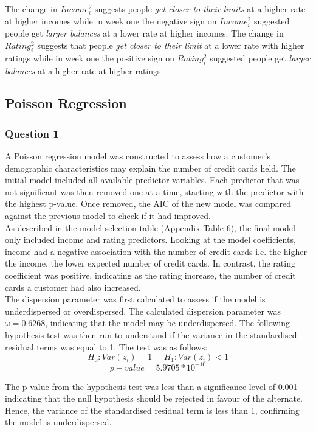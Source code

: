 \documentclass[12pt]{article}
\begin{document}
{The change in $Income^2_i$ suggests people \emph{get closer to their limits} at a higher rate at higher incomes while in week one the negative sign on $Income^2_i$ suggested people get \emph{larger balances} at a lower rate at higher incomes. The change in $Rating^2_i$ suggests that people \emph{get closer to their limit} at a lower rate with higher ratings while in week one the positive sign on $Rating^2_i$ suggested people get \emph{larger balances} at a higher rate at higher ratings. 

\subsection*{Poisson Regression}
\subsubsection*{Question 1}
A Poisson regression model was constructed to assess how a customer’s demographic characteristics may explain the number of credit cards held. The initial model included all available predictor variables. Each predictor that was not significant was then removed one at a time, starting with the predictor with the highest p-value. Once removed, the AIC of the new model was compared against the previous model to check if it had improved.\\

As described in the model selection table (Appendix Table 6), the final model only included income and rating predictors. Looking at the model coefficients, income had a negative association with the number of credit cards i.e. the higher the income, the lower expected number of credit cards. In contrast, the rating coefficient was positive, indicating as the rating increase, the number of credit cards a customer had also increased.\\

The dispersion parameter was first calculated to assess if the model is underdispersed or overdispersed. The calculated dispersion parameter was $\omega = 0.6268$, indicating that the model may be underdispersed. The following hypothesis test was then run to understand if the variance in the standardised residual terms was equal to 1. The test was as follows:\\
$$H_0: Var(z_i) = 1 \; \; \; \; \; H_1: Var(z_i) < 1$$
$$p-value = 5.9705*10^{-10}$$

The p-value from the hypothesis test was less than a significance level of 0.001 indicating that the null hypothesis should be rejected in favour of the alternate. Hence, the variance of the standardised residual term is less than 1, confirming the model is underdispersed.\\

}
\end{document}
